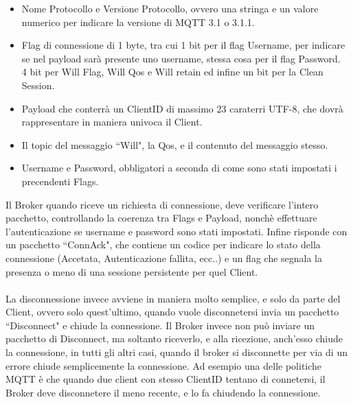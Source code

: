 \documentclass{article}
\begin{document}
\begin{itemize}
	\item Nome Protocollo e Versione Protocollo, ovvero una stringa e un valore numerico per indicare la versione di MQTT 3.1 o 3.1.1.
	\item Flag di connessione di 1 byte, tra cui 1 bit per il flag Username, per indicare se nel payload sarà presente uno username, stessa cosa per il flag Password.\\4 bit per Will Flag, Will Qos e Will retain ed infine un bit per la Clean Session. 
	\item Payload che conterrà un ClientID di massimo 23 caraterri UTF-8, che dovrà rappresentare in maniera univoca il Client.
	\item Il topic del messaggio ``Will", la Qos, e il contenuto del messaggio stesso.
	\item Username e Password, obbligatori a seconda di come sono stati impostati i precendenti Flags.
\end{itemize}
Il Broker quando riceve un richiesta di connessione, deve verificare l'intero pacchetto, controllando la coerenza tra Flags e Payload, nonchè effettuare l'autenticazione se username e password sono stati impostati. Infine risponde con un pacchetto ``ConnAck", che contiene un codice per indicare lo stato della connessione (Accetata, Autenticazione fallita, ecc..) e un flag che segnala la presenza o meno di una sessione persistente per quel Client.\\\\La disconnessione invece avviene in maniera molto semplice, e solo da parte del Client, ovvero solo quest'ultimo, quando vuole disconnetersi invia un pacchetto ``Disconnect" e chiude la connessione. Il Broker invece non può inviare un pacchetto di Disconnect, ma soltanto riceverlo, e alla ricezione, anch'esso chiude la connessione, in tutti gli altri casi, quando il broker si disconnette per via di un errore chiude semplicemente la connessione. Ad esempio una delle politiche MQTT è che quando due client con stesso ClientID tentano di connetersi, il Broker deve disconnetere il meno recente, e lo fa chiudendo la connessione.
\end{document}
